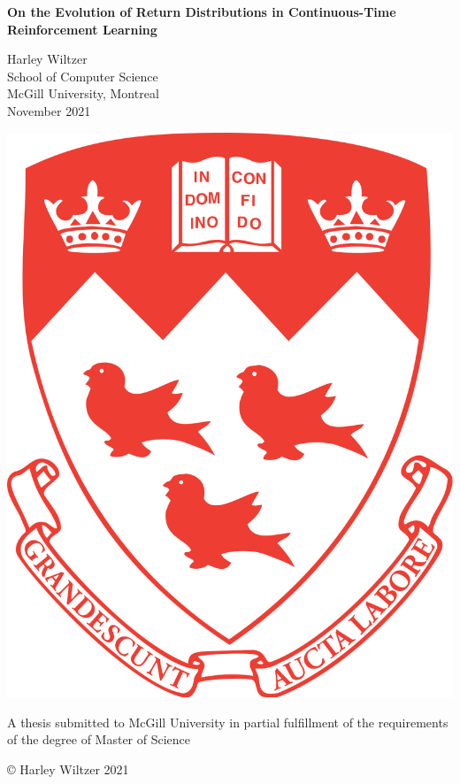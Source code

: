 \begin{titlepage}
  \begin{center}
    \vspace*{1cm}

    \huge
    \textbf{On the Evolution of Return Distributions in
      Continuous-Time Reinforcement Learning}

    \vspace{1cm}

    \LARGE
    Harley Wiltzer\\
    \Large
    School of Computer Science\\
    McGill University, Montreal\\
    November 2021

    \vspace{1cm}
    \includegraphics[scale=0.1]{mcgill-logo}

    \vfill

    \large
    A thesis submitted to McGill University in partial fulfillment of
    the requirements of the degree of Master of Science

    \vspace{1cm}

    © Harley Wiltzer 2021
  \end{center}
\end{titlepage}
